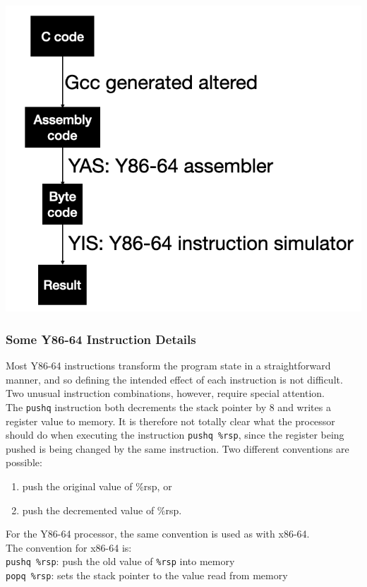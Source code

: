 \documentclass[11pt]{article}
\begin{document}
\begin{center}
\includegraphics[width=.9\linewidth]{pics/y86-64.png}
\end{center}


\subsubsection{Some Y86-64 Instruction Details}
\label{sec:org17b4dc7}
Most Y86-64 instructions transform the program state in a straightforward manner, and so defining the intended effect of each instruction is not difficult. Two unusual instruction combinations, however, require special attention.\\

The \texttt{pushq} instruction both decrements the stack pointer by 8 and writes a register value to memory. It is therefore not totally clear what the processor should do when executing the instruction \texttt{pushq \%rsp}, since the register being pushed is being changed by the same instruction. Two different conventions are possible:\\
\begin{enumerate}
\item push the original value of \%rsp, or\\
\item push the decremented value of \%rsp.\\
\end{enumerate}

For the Y86-64 processor, the same convention is used as with x86-64.\\
The convention for x86-64 is:\\
\texttt{pushq \%rsp}: push the old value of \texttt{\%rsp} into memory\\
\texttt{popq \%rsp}: sets the stack pointer to the value read from memory\\
\end{document}
